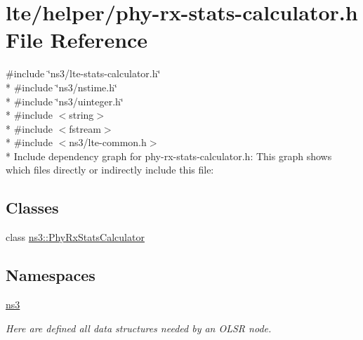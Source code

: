 \hypertarget{phy-rx-stats-calculator_8h}{}\section{lte/helper/phy-\/rx-\/stats-\/calculator.h File Reference}
\label{phy-rx-stats-calculator_8h}
{\ttfamily \#include \char`\"{}ns3/lte-\/stats-\/calculator.\+h\char`\"{}}\\*
{\ttfamily \#include \char`\"{}ns3/nstime.\+h\char`\"{}}\\*
{\ttfamily \#include \char`\"{}ns3/uinteger.\+h\char`\"{}}\\*
{\ttfamily \#include $<$string$>$}\\*
{\ttfamily \#include $<$fstream$>$}\\*
{\ttfamily \#include $<$ns3/lte-\/common.\+h$>$}\\*
Include dependency graph for phy-\/rx-\/stats-\/calculator.h\+:
This graph shows which files directly or indirectly include this file\+:
\subsection*{Classes}
\begin{DoxyCompactItemize}
\item 
class \hyperlink{classns3_1_1PhyRxStatsCalculator}{ns3\+::\+Phy\+Rx\+Stats\+Calculator}
\end{DoxyCompactItemize}
\subsection*{Namespaces}
\begin{DoxyCompactItemize}
\item 
 \hyperlink{namespacens3}{ns3}
\begin{DoxyCompactList}\small\item\em Here are defined all data structures needed by an O\+L\+SR node. \end{DoxyCompactList}\end{DoxyCompactItemize}

